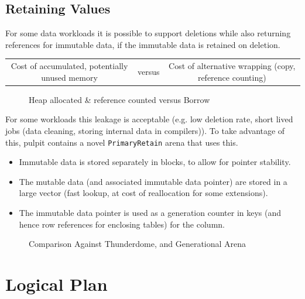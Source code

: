 \subsection{Retaining Values}
For some data workloads it is possible to support deletions while also returning references for immutable data, if the immutable data is retained on deletion.
\begin{center}
    \begin{tabular}{c c c}
        Cost of accumulated, potentially unused memory & versus & Cost of alternative wrapping (copy, reference counting) \\
    \end{tabular}
\end{center}

\begin{figure}[h!]
    \centering
    \vspace{-0.4em}
    \resizebox{\textwidth}{!}{}
    \caption{Heap allocated \& reference counted versus Borrow}
\end{figure}

For some workloads this leakage is acceptable (e.g. low deletion rate, short lived jobs (data cleaning, storing internal data in compilers)). To take advantage of this, pulpit contains a novel \texttt{PrimaryRetain} arena that uses this.
\begin{itemize}
    \setlength\itemsep{0em}
    \item Immutable data is stored separately in blocks, to allow for pointer stability.
    \item The mutable data (and associated immutable data pointer) are stored in a large vector (fast lookup, at cost of reallocation for some extensions).
    \item The immutable data pointer is used as a generation counter in keys (and hence row references for enclosing tables) for the column.
\end{itemize}

\begin{figure}[h!]
    \centering
    \vspace{-0.4em}
    \resizebox{\textwidth}{!}{}
    \caption{Comparison Against Thunderdome, and Generational Arena}
\end{figure}

\section{Logical Plan}


